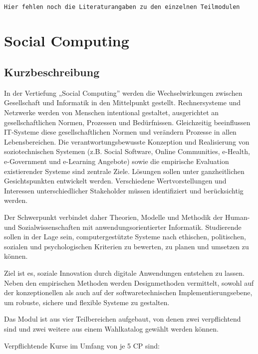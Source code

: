 \begin{verbatim}

Hier fehlen noch die Literaturangaben zu den einzelnen Teilmodulen
\end{verbatim}

\chapter{Social Computing}\label{social-computing}

\section*{Kurzbeschreibung}\label{kurzbeschreibung-6}

In der Vertiefung „Social Computing'' werden die Wechselwirkungen
zwischen Gesellschaft und Informatik in den Mittelpunkt gestellt.
Rechnersysteme und Netzwerke werden von Menschen intentional gestaltet,
ausgerichtet an gesellschaftlichen Normen, Prozessen und Bedürfnissen.
Gleichzeitig beeinflussen IT-Systeme diese gesellschaftlichen Normen und
verändern Prozesse in allen Lebensbereichen. Die verantwortungsbewusste
Konzeption und Realisierung von soziotechnischen Systemen (z.B. Social
Software, Online Communities, e-Health, e-Government und e-Learning
Angebote) sowie die empirische Evaluation existierender Systeme sind
zentrale Ziele. Lösungen sollen unter ganzheitlichen Gesichtspunkten
entwickelt werden. Verschiedene Wertvorstellungen und Interessen
unterschiedlicher Stakeholder müssen identifiziert und berücksichtig
werden.

Der Schwerpunkt verbindet daher Theorien, Modelle und Methodik der
Human- und Sozialwissenschaften mit anwendungsorientierter Informatik.
Studierende sollen in der Lage sein, computergestützte Systeme nach
ethischen, politischen, sozialen und psychologischen Kriterien zu
bewerten, zu planen und umsetzen zu können.

Ziel ist es, soziale Innovation durch digitale Anwendungen entstehen zu
lassen. Neben den empirischen Methoden werden Designmethoden vermittelt,
sowohl auf der konzeptionellen als auch auf der softwaretechnischen
Implementierungsebene, um robuste, sichere und flexible Systeme zu
gestalten.

Das Modul ist aus vier Teilbereichen aufgebaut, von denen zwei
verpflichtend sind und zwei weitere aus einem Wahlkatalog gewählt werden
können.

Verpflichtende Kurse im Umfang von je 5 CP sind:

